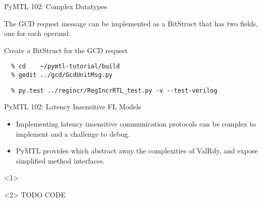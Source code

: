 \begin{frame}{PyMTL 102: Complex Datatypes}

The GCD request message can be implemented as a BitStruct that has two
fields, one for each operand:

\vspace{.2in}
\end{frame}

\begin{task}\begin{frame}[fragile]{Create a BitStruct for the GCD request}
\vspace{-0.25in}
\begin{verbatim}
  % cd    ~/pymtl-tutorial/build
  % gedit ../gcd/GcdUnitMsg.py
\end{verbatim}


\vspace{-0.3in}
\begin{verbatim}
  % py.test ../regincr/RegIncrRTL_test.py -v --test-verilog
\end{verbatim}
\end{frame}
\end{task}

\begin{frame}{PyMTL 102: Latency Insensitive FL Models}
\begin{itemize}
  \item Implementing latency insensitive communication protocols can be
        complex to implement and a challenge to debug.
  \smallskip
  \item PyMTL provides  which abstract away the
        complexities of ValRdy, and expose simplified method interfaces.
\end{itemize}

  \begin{onlyenv}<1>
  \end{onlyenv}

  \begin{onlyenv}<2>
  TODO CODE
  \end{onlyenv}

\end{frame}

